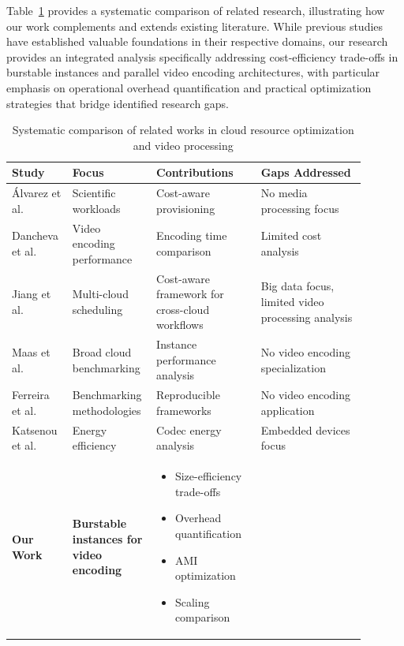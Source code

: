 \documentclass[conference]{IEEEtran}
\begin{document}
	Table~\ref{tab:comparative_analysis} provides a systematic comparison of related research, illustrating how our work complements and extends existing literature. While previous studies have established valuable foundations in their respective domains, our research provides an integrated analysis specifically addressing cost-efficiency trade-offs in burstable instances and parallel video encoding architectures, with particular emphasis on operational overhead quantification and practical optimization strategies that bridge identified research gaps.
	
	\begin{table}[!htbp]
		\centering
		\caption{Systematic comparison of related works in cloud resource optimization and video processing}
		\label{tab:comparative_analysis}
		\begin{tabular}{|p{0.15\linewidth}|p{0.18\linewidth}|p{0.28\linewidth}|p{0.28\linewidth}|}
			\hline
			\textbf{Study} & \textbf{Focus} & \textbf{Contributions} & \textbf{Gaps Addressed} \\
			\hline
			Álvarez et al. \cite{b2} & Scientific workloads & Cost-aware provisioning & No media processing focus \\
			\hline
			Dancheva et al. \cite{b3} & Video encoding performance & Encoding time comparison & Limited cost analysis \\
			\hline
			Jiang et al. \cite{b20} & Multi-cloud scheduling & Cost-aware framework for cross-cloud workflows & Big data focus, limited video processing analysis \\
			\hline
			Maas et al. \cite{b1} & Broad cloud benchmarking & Instance performance analysis & No video encoding specialization \\
			\hline
			Ferreira et al. \cite{b9} & Benchmarking methodologies & Reproducible frameworks & No video encoding application \\
			\hline
			Katsenou et al. \cite{b8} & Energy efficiency & Codec energy analysis & Embedded devices focus \\
			\hline
			\textbf{Our Work} & \textbf{Burstable instances for video encoding} & 
			\scriptsize
			\begin{itemize}
				\vspace{-0.2cm}
				\item Size-efficiency trade-offs
				\item Overhead quantification  
				\item AMI optimization
				\item Scaling comparison

\end{itemize}
\end{tabular}
\end{table}
\end{document}
